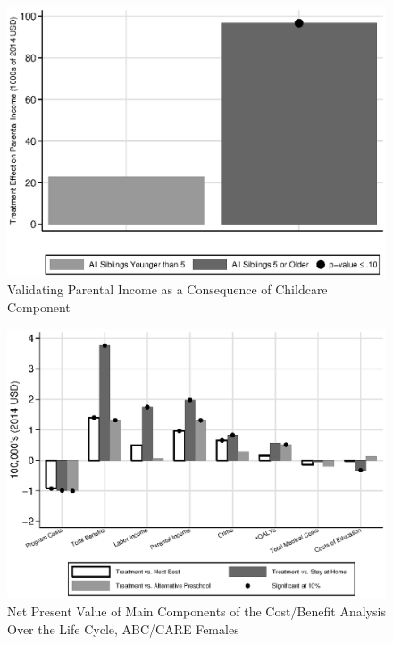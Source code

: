 \begin{frame}[plain]
	\begin{center}
\begin{figure}[H] 
\caption{Validating Parental Income as a Consequence of Childcare Component}
\label{figure:youlabel}
\centering
\includegraphics[width=.9\columnwidth]{output/abccare_pincomesumsibage_spooled.eps}
\end{figure}
\end{center}
\end{frame}

\begin{frame}[plain]
	\begin{center}
\begin{figure}[H] 
\caption{Net Present Value of Main Components of the Cost/Benefit Analysis Over the Life Cycle, ABC/CARE Females}
\label{figure:youlabel}
\centering
\includegraphics[width=.9\columnwidth]{output/abccare_npvs1.eps}
\end{figure}
\end{center}
\end{frame}

